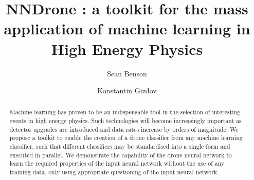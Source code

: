 \documentclass[final,5p,times,twocolumn]{elsarticle}
\begin{document}

\begin{frontmatter}
\author[nl]{Sean Benson}
\author[uoe]{Konstantin Gizdov}
\address[nl]{Nikhef National Institute for Subatomic Physics, Amsterdam, The Netherlands}
\address[uoe]{School of Physics and Astronomy, University of Edinburgh, Edinburgh, United Kingdom}
\title{NNDrone : a toolkit for the mass application of machine learning in High Energy Physics}
\begin{abstract}
  \noindent
  Machine learning has proven to be an indispensable tool in the selection of
  interesting events in high energy physics. Such technologies will become increasingly
  important as detector upgrades are introduced and data rates increase by orders of magnitude.
  We propose a toolkit to enable the creation of a drone classifier from any machine learning
  classifier, such that different classifiers may be standardised into a single form and executed
  in parallel. We demonstrate the capability of the drone neural network 
  to learn the required properties of the input neural network without
  the use of any training data, only using appropriate questioning of the input neural network.
\end{abstract}
\end{frontmatter}










\end{document}
